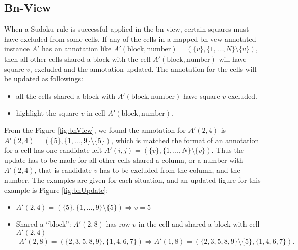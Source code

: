 \documentclass[11pt]{report}
\newcommand{\set}[1]{\{ #1 \}}
\begin{document}
\subsection{Bn-View}
\label{sec:basicruleBn}

When a Sudoku rule is successful applied in the bn-view, certain squares must have excluded from some cells. If any of the cells in a mapped bn-vew annotated instance $A'$ has an annotation like $A'(\text{block}, \text{number}) =(\set{v}, \set{1,\dots,N} \setminus \set{v})$, then all other cells shared a block with the cell $A'(\text{block}, \text{number})$ will have square $v$, excluded and the annotation updated. The annotation for the cells will be updated as followings:
\begin{itemize}
\item all the cells shared a block with $A'(\text{block}, \text{number})$ have square $v$ excluded.
\item highlight the square $v$ in cell $A'(\text{block}, \text{number})$.
\end{itemize} 

From the Figure \ref{fig:bnView}, we found the annotation for $A'(2,4)$ is $A'(2, 4) =(\set{5}, \set{1, \dots, 9} \setminus \set{5})$, which is matched the format of an annotation for a cell has one candidate left $A'(i,j) =(\set{v}, \set{1,\dots,N} \setminus \set{v})$. Thus the update has to be made for all other cells shared a column, or a number with $A'(2,4)$, that is candidate $v$ has to be excluded from the column, and the number. The examples are given for each situation, and an updated figure for this example is Figure \ref{fig:bnUpdate}:
\begin{itemize}
\item $A'(2,4) =(\set{5}, \set{1, \dots, 9} \setminus \set{5}) \Rightarrow v = 5$
\item Shared a ``block'': $A'(2,8)$ has row $v$ in the cell and shared a block with cell $A'(2,4)$
\begin{eqnarray*}
A'(2,8) =(\set{2, 3, 5, 8, 9}, \set{1, 4, 6, 7})\Rightarrow A'(1,8) =(\set{2, 3, 5, 8, 9}\setminus \set{5}, \set{1, 4, 6, 7}).
\end{eqnarray*}
\end{itemize}
\end{document}
